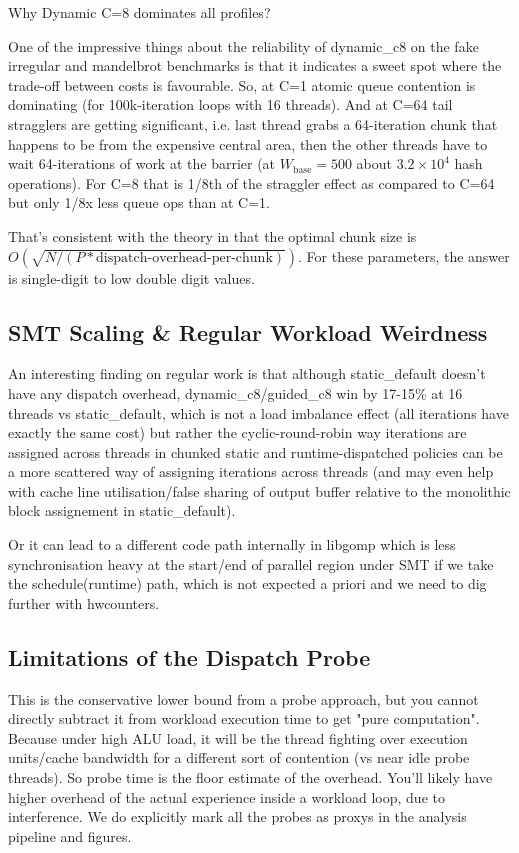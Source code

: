 \documentclass[conference]{IEEEtran}
\begin{document}
Why Dynamic C=8 dominates all profiles?

One of the impressive things about the reliability of dynamic\_c8 on the fake irregular and mandelbrot benchmarks is that it indicates a sweet spot where the trade-off between costs is favourable. So, at C=1 atomic queue contention is dominating (for 100k-iteration loops with 16 threads). And at C=64 tail stragglers are getting significant, i.e. last thread grabs a 64-iteration chunk that happens to be from the expensive central area, then the other threads have to wait 64-iterations of work at the barrier (at $W_{\text{base}}=500$ about $3.2 \times 10^4$ hash operations). For C=8 that is 1/8th of the straggler effect as compared to C=64 but only 1/8x less queue ops than at C=1.

That's consistent with the theory in \cite{hummel1992factoring} that the optimal chunk size is $O(\sqrt{N / (P*\text{dispatch-overhead-per-chunk})})$. For these parameters, the answer is single-digit to low double digit values.

\subsection{SMT Scaling \& Regular Workload Weirdness}

An interesting finding on regular work is that although static\_default doesn't have any dispatch overhead, dynamic\_c8/guided\_c8 win by 17-15\% at 16 threads vs static\_default, which is not a load imbalance effect (all iterations have exactly the same cost) but rather the cyclic-round-robin way iterations are assigned across threads in chunked static and runtime-dispatched policies can be a more scattered way of assigning iterations across threads (and may even help with cache line utilisation/false sharing of output buffer relative to the monolithic block assignement in static\_default).

Or it can lead to a different code path internally in libgomp which is less synchronisation heavy at the start/end of parallel region under SMT if we take the schedule(runtime) path, which is not expected a priori and we need to dig further with hwcounters.

\subsection{Limitations of the Dispatch Probe}

This is the conservative lower bound from a probe approach, but you cannot directly subtract it from workload execution time to get "pure computation". Because under high ALU load, it will be the thread fighting over execution units/cache bandwidth for a different sort of contention (vs near idle probe threads). So probe time is the floor estimate of the overhead. You'll likely have higher overhead of the actual experience inside a workload loop, due to interference. We do explicitly mark all the probes as proxys in the analysis pipeline and figures.
\end{document}
